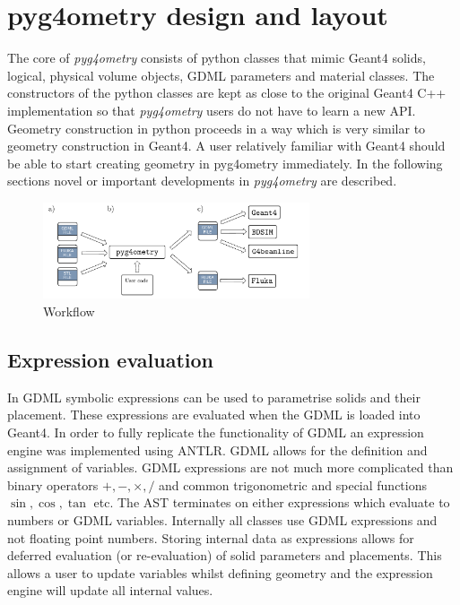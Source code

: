 \documentclass[final,5p,times,twocolumn]{elsarticle}
\begin{document}
\section{pyg4ometry design and layout}
The core of {\em pyg4ometry} consists of python classes that mimic Geant4 solids, logical, physical volume objects, GDML parameters and material classes.
The constructors of the python classes are kept as close to the original Geant4 C++ implementation so that {\it pyg4ometry} users do not have to learn 
a new API. Geometry construction in python proceeds in a way which is very similar to geometry construction in Geant4. A user relatively familiar with Geant4
should be able to start creating geometry in pyg4ometry immediately. In the following sections novel or important developments in {\it pyg4ometry} are described.  

\begin{figure}[hbt]
  \normalsize
  \centering
  \includegraphics[width=0.7\textwidth]{./diagrams/workflow.pdf}
  \caption{\label{fig:workflow}Workflow}
\end{figure}

    
\subsection{Expression evaluation}
In GDML symbolic expressions can be used to parametrise solids and their placement. These expressions are evaluated when the GDML is loaded into Geant4. 
In order to fully replicate the functionality of GDML an expression engine was implemented using ANTLR. GDML allows for the definition and assignment of 
variables. GDML expressions are not much more complicated than binary operators $+, -, \times, /$ and common trigonometric and special functions $\sin, \cos, \tan$ etc. 
The AST terminates on either expressions which evaluate to numbers or GDML variables. Internally all classes use GDML expressions and not floating point numbers. 
Storing internal data as expressions allows for deferred evaluation (or re-evaluation) of solid parameters and placements. This allows a user to update variables whilst
defining geometry and the expression engine will update all internal values.  
 
\end{document}
